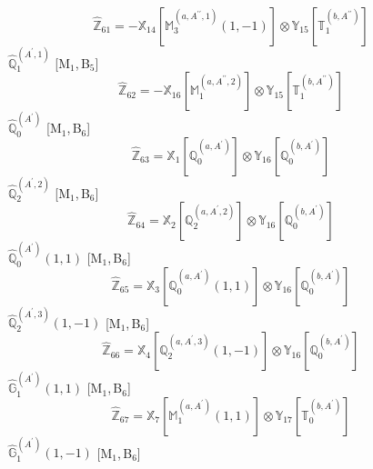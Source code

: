 \documentclass[fleqn,10pt,landscape]{article}
\begin{document}
\begin{itemize}
\begin{dmath*}
\hat{\mathbb{Z}}_{61}=- \mathbb{X}_{14}[\mathbb{M}_{3}^{(a,A^{\prime\prime},1)}(1,-1)] \otimes\mathbb{Y}_{15}[\mathbb{T}_{1}^{(b,A^{\prime\prime})}]
\end{dmath*}
\vspace{4mm}
\noindent {} $\,\,\,\hat{\mathbb{Q}}_{1}^{(A^{\prime},1)}$ [M$_{1}$,\,B$_{5}$]
\begin{dmath*}
\hat{\mathbb{Z}}_{62}=- \mathbb{X}_{16}[\mathbb{M}_{1}^{(a,A^{\prime\prime},2)}] \otimes\mathbb{Y}_{15}[\mathbb{T}_{1}^{(b,A^{\prime\prime})}]
\end{dmath*}
\vspace{4mm}
\noindent {} $\,\,\,\hat{\mathbb{Q}}_{0}^{(A^{\prime})}$ [M$_{1}$,\,B$_{6}$]
\begin{dmath*}
\hat{\mathbb{Z}}_{63}=\mathbb{X}_{1}[\mathbb{Q}_{0}^{(a,A^{\prime})}] \otimes\mathbb{Y}_{16}[\mathbb{Q}_{0}^{(b,A^{\prime})}]
\end{dmath*}
\vspace{4mm}
\noindent {} $\,\,\,\hat{\mathbb{Q}}_{2}^{(A^{\prime},2)}$ [M$_{1}$,\,B$_{6}$]
\begin{dmath*}
\hat{\mathbb{Z}}_{64}=\mathbb{X}_{2}[\mathbb{Q}_{2}^{(a,A^{\prime},2)}] \otimes\mathbb{Y}_{16}[\mathbb{Q}_{0}^{(b,A^{\prime})}]
\end{dmath*}
\vspace{4mm}
\noindent {} $\,\,\,\hat{\mathbb{Q}}_{0}^{(A^{\prime})}(1,1)$ [M$_{1}$,\,B$_{6}$]
\begin{dmath*}
\hat{\mathbb{Z}}_{65}=\mathbb{X}_{3}[\mathbb{Q}_{0}^{(a,A^{\prime})}(1,1)] \otimes\mathbb{Y}_{16}[\mathbb{Q}_{0}^{(b,A^{\prime})}]
\end{dmath*}
\vspace{4mm}
\noindent {} $\,\,\,\hat{\mathbb{Q}}_{2}^{(A^{\prime},3)}(1,-1)$ [M$_{1}$,\,B$_{6}$]
\begin{dmath*}
\hat{\mathbb{Z}}_{66}=\mathbb{X}_{4}[\mathbb{Q}_{2}^{(a,A^{\prime},3)}(1,-1)] \otimes\mathbb{Y}_{16}[\mathbb{Q}_{0}^{(b,A^{\prime})}]
\end{dmath*}
\vspace{4mm}
\noindent {} $\,\,\,\hat{\mathbb{G}}_{1}^{(A^{\prime})}(1,1)$ [M$_{1}$,\,B$_{6}$]
\begin{dmath*}
\hat{\mathbb{Z}}_{67}=\mathbb{X}_{7}[\mathbb{M}_{1}^{(a,A^{\prime})}(1,1)] \otimes\mathbb{Y}_{17}[\mathbb{T}_{0}^{(b,A^{\prime})}]
\end{dmath*}
\vspace{4mm}
\noindent {} $\,\,\,\hat{\mathbb{G}}_{1}^{(A^{\prime})}(1,-1)$ [M$_{1}$,\,B$_{6}$]

\end{itemize}
\end{document}
